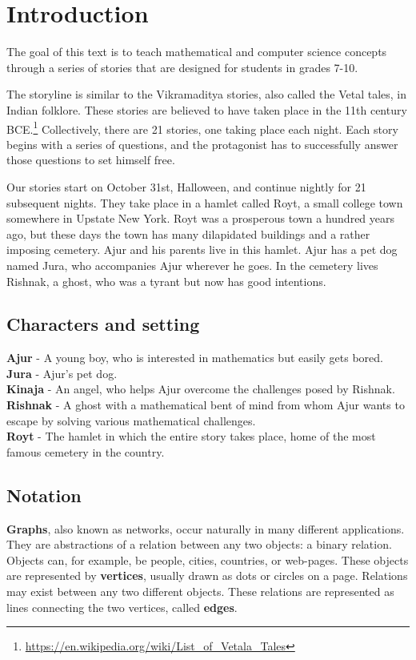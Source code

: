 \chapter{Introduction}
The goal of this text is to teach mathematical and computer science concepts through a series of stories
that are designed for students in grades 7-10.

The storyline is similar to the Vikramaditya stories, also called the Vetal tales, in Indian folklore. These stories are believed to have taken place in the 11th century BCE.\footnote{\url{https://en.wikipedia.org/wiki/List_of_Vetala_Tales}}
Collectively, there are 21 stories, one taking place each night. Each story begins with a series of questions, and the protagonist has to successfully answer those questions to set himself free. 


Our stories start on October 31st, Halloween, and continue nightly for 21 subsequent nights. They take place in a hamlet called Royt, a small college town somewhere in Upstate New York. Royt was a prosperous town a hundred years ago, but these days the town has many dilapidated buildings and a rather imposing cemetery. Ajur and his parents live in this hamlet. Ajur has a pet dog named Jura, who accompanies Ajur wherever he goes.  In the cemetery lives Rishnak, a ghost, who was a tyrant but now has good intentions.

\section{Characters and setting}

\textbf {Ajur} - A young boy, who is interested in mathematics but easily gets bored.\\
\noindent
\textbf {Jura} - Ajur's pet dog.\\
\noindent
\textbf{Kinaja} - An angel, who helps Ajur overcome the challenges posed by Rishnak.\\
\noindent
\textbf{Rishnak} - A ghost with a mathematical bent of mind from whom Ajur wants to escape by solving various mathematical challenges.\\
\noindent
\textbf{Royt} - The hamlet in which the entire story takes place, home of the most famous cemetery in the country.

\begin{newpage}
\end{newpage}
\section{Notation}
\textbf{Graphs}, also known as networks, occur naturally in many different applications. They are abstractions of a relation between any two objects: a binary relation. Objects can, for example, be people, cities, countries, or web-pages. These objects are represented by \textbf{vertices}, usually drawn as dots 
or circles on a page. Relations may exist between any two different objects. These relations are represented as lines connecting the two vertices, called \textbf{edges}.

